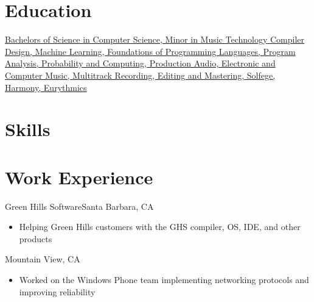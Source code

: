 \documentclass[11pt,letterpaper,sans,final]{moderncv}
\begin{document}
\makecvtitle

\vspace*{-2\baselineskip}


\section{Education}
  \href{http://coursecatalog.web.cmu.edu/schoolofcomputerscience/#curriculum-b.s.incomputerscience}
  {
      {Bachelors of Science in Computer Science, Minor in Music Technology}
      {
        Compiler Design,
        Machine Learning,
        Foundations of Programming Languages,
        Program Analysis,
        Probability and Computing,
        Production Audio,
        Electronic and Computer Music,
        Multitrack Recording,
        Editing and Mastering,
        Solfege,
        Harmony,
        Eurythmics
      }
  }

\section{Skills}

\section{Work Experience}
    {Green Hills Software}{Santa Barbara, CA}{}{
      \begin{itemize}
        \item Helping Green Hills customers with the GHS compiler, OS, IDE, and
          other products
      \end{itemize}
    }
    {Mountain View, CA}{}{
      \begin{itemize}
         \item Worked on the Windows Phone team implementing networking
           protocols and improving reliability
      \end{itemize}
    }
\end{document}
